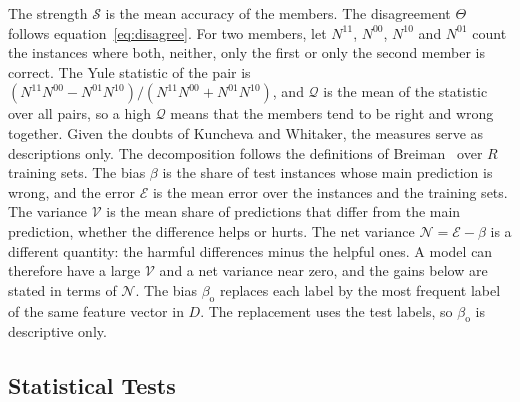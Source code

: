 \documentclass[10pt,conference]{IEEEtran}
\begin{document}
The strength $\mathcal{S}$ is the mean accuracy of the members. The disagreement $\Theta$ follows equation~\eqref{eq:disagree}. For two members, let $N^{11}$, $N^{00}$, $N^{10}$ and $N^{01}$ count the instances where both, neither, only the first or only the second member is correct. The Yule statistic of the pair is $(N^{11} N^{00} - N^{01} N^{10}) / (N^{11} N^{00} + N^{01} N^{10})$, and $\mathcal{Q}$ is the mean of the statistic over all pairs, so a high $\mathcal{Q}$ means that the members tend to be right and wrong together. Given the doubts of Kuncheva and Whitaker, the measures serve as descriptions only. The decomposition follows the definitions of Breiman~\cite{breiman1998} over $R$ training sets. The bias $\beta$ is the share of test instances whose main prediction is wrong, and the error $\mathcal{E}$ is the mean error over the instances and the training sets. The variance $\mathcal{V}$ is the mean share of predictions that differ from the main prediction, whether the difference helps or hurts. The net variance $\mathcal{N} = \mathcal{E} - \beta$ is a different quantity: the harmful differences minus the helpful ones. A model can therefore have a large $\mathcal{V}$ and a net variance near zero, and the gains below are stated in terms of $\mathcal{N}$. The bias $\beta_{\mathrm{o}}$ replaces each label by the most frequent label of the same feature vector in $D$. The replacement uses the test labels, so $\beta_{\mathrm{o}}$ is descriptive only.

\subsection{Statistical Tests}
\label{sec:procedure-statistics}
\end{document}
